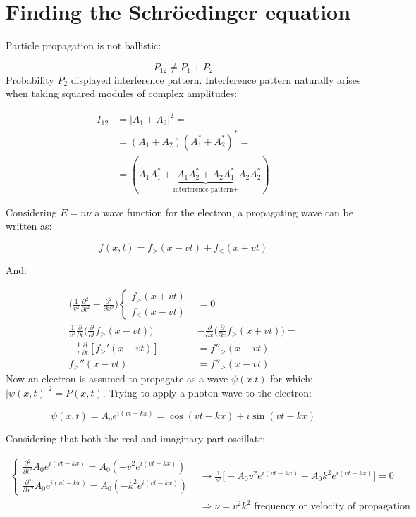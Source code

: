 \section{Finding the Schr\"oedinger equation}
Particle propagation is not ballistic:

$$P_{12} \neq P_1 + P_2$$
\noindent
Probability $P_2$ displayed interference pattern.
Interference pattern naturally arises when taking squared modules of complex amplitudes:

\begin{align*}
  I_{12} &= |A_1 + A_2|^2=\\
         &=(A_1 + A_2)(A_1^*+A_2^*)^*=\\
         &=(A_1A_1^*+\underbrace{A_1A_2^*+A_2A_1^*}_{\text{interference pattern+}}A_2A_2^*)
\end{align*}


Considering $E=n\nu$ a wave function for the electron, a propagating wave can be written as:

$$f(x,t) = f_>(x-vt)+f_<(x+vt)$$

And:

\begin{align*}
  \biggl(\frac{1}{v^2}\frac{\partial {^2}}{\partial {t^2}}-\frac{\partial {^2}}{\partial {x^2}}\biggr)\begin{cases}f_>(x+vt)\\f_<(x-vt)\end{cases} &= 0\\
  \frac{1}{v^2}\frac{\partial {}}{\partial {t}}\biggl(\frac{\partial {}}{\partial {t}}f_>(x-vt)\biggr)&-\frac{\partial {}}{\partial {x}}\biggl(\frac{\partial {}}{\partial {x}}f_>(x+vt)\biggr)=\\
  -\frac{1}{v}\frac{\partial {}}{\partial {t}}[f_>'(x-vt)]&=f''_>(x-vt)\\
  f_>''(x-vt) &=f''_>(x-vt)
\end{align*}
\noindent
Now an electron is assumed to propagate as a wave $\psi(x.t)$ for which: $|\psi(x,t)|^2 = P(x,t)$.
Trying to apply a photon wave to the electron:

$$\psi(x,t) = A_oe^{i(vt-kx)} = \cos(vt-kx) + i\sin(vt - kx)$$

\noindent
Considering that both the real and imaginary part oscillate:

\begin{align*}
  \begin{cases}\frac{\partial {^2}}{\partial {t^2}}A_0e^{i(vt-kx)} = A_0(-v^2e^{i(vt-kx)})\\\frac{\partial {^2}}{\partial {x^2}}A_0e^{i(vt-kx)} = A_0(-k^2e^{i(vt-kx)})\end{cases}&\rightarrow \frac{1}{\nu^2}\biggl[-A_0v^2e^{i(vt-kx)}+A_0k^2e^{i(vt-kx)}\biggr] = 0\\
                                                                                                                                                                                  &\Rightarrow \nu = v^2k^2\text{ frequency or velocity of propagation}
\end{align*}

